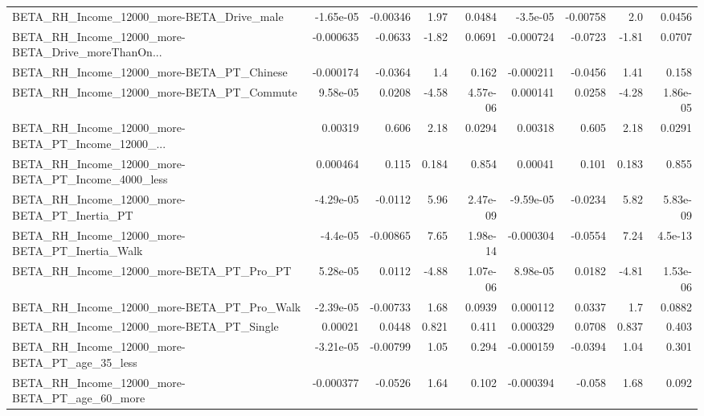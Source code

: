\begin{tabular}{lrrrrrrrr}
BETA\_RH\_Income\_12000\_more-BETA\_Drive\_male          &   -1.65e-05 &     -0.00346 &     1.97 &   0.0484 &   -3.5e-05 &    -0.00758 &          2.0 &        0.0456 \\
BETA\_RH\_Income\_12000\_more-BETA\_Drive\_moreThanOn... &   -0.000635 &      -0.0633 &    -1.82 &   0.0691 &  -0.000724 &     -0.0723 &        -1.81 &        0.0707 \\
BETA\_RH\_Income\_12000\_more-BETA\_PT\_Chinese          &   -0.000174 &      -0.0364 &      1.4 &    0.162 &  -0.000211 &     -0.0456 &         1.41 &         0.158 \\
BETA\_RH\_Income\_12000\_more-BETA\_PT\_Commute          &    9.58e-05 &       0.0208 &    -4.58 & 4.57e-06 &   0.000141 &      0.0258 &        -4.28 &      1.86e-05 \\
BETA\_RH\_Income\_12000\_more-BETA\_PT\_Income\_12000\_... &     0.00319 &        0.606 &     2.18 &   0.0294 &    0.00318 &       0.605 &         2.18 &        0.0291 \\
BETA\_RH\_Income\_12000\_more-BETA\_PT\_Income\_4000\_less &    0.000464 &        0.115 &    0.184 &    0.854 &    0.00041 &       0.101 &        0.183 &         0.855 \\
BETA\_RH\_Income\_12000\_more-BETA\_PT\_Inertia\_PT       &   -4.29e-05 &      -0.0112 &     5.96 & 2.47e-09 &  -9.59e-05 &     -0.0234 &         5.82 &      5.83e-09 \\
BETA\_RH\_Income\_12000\_more-BETA\_PT\_Inertia\_Walk     &    -4.4e-05 &     -0.00865 &     7.65 & 1.98e-14 &  -0.000304 &     -0.0554 &         7.24 &       4.5e-13 \\
BETA\_RH\_Income\_12000\_more-BETA\_PT\_Pro\_PT           &    5.28e-05 &       0.0112 &    -4.88 & 1.07e-06 &   8.98e-05 &      0.0182 &        -4.81 &      1.53e-06 \\
BETA\_RH\_Income\_12000\_more-BETA\_PT\_Pro\_Walk         &   -2.39e-05 &     -0.00733 &     1.68 &   0.0939 &   0.000112 &      0.0337 &          1.7 &        0.0882 \\
BETA\_RH\_Income\_12000\_more-BETA\_PT\_Single           &     0.00021 &       0.0448 &    0.821 &    0.411 &   0.000329 &      0.0708 &        0.837 &         0.403 \\
BETA\_RH\_Income\_12000\_more-BETA\_PT\_age\_35\_less      &   -3.21e-05 &     -0.00799 &     1.05 &    0.294 &  -0.000159 &     -0.0394 &         1.04 &         0.301 \\
BETA\_RH\_Income\_12000\_more-BETA\_PT\_age\_60\_more      &   -0.000377 &      -0.0526 &     1.64 &    0.102 &  -0.000394 &      -0.058 &         1.68 &         0.092 \\

\end{tabular}
